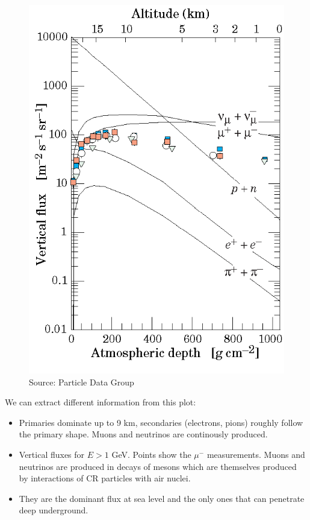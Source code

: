 \documentclass[
  letterpaper,
  DIV=11,
  numbers=noendperiod]{scrreprt}
\begin{document}
\begin{figure}[H]

{\centering \includegraphics{images/cr_fig3_07.png}

}

\caption{Source: Particle Data Group}

\end{figure}%

We can extract different information from this plot:

\begin{itemize}
\item
  Primaries dominate up to 9 km, secondaries (electrons, pions) roughly
  follow the primary shape. Muons and neutrinos are continously
  produced.
\item
  Vertical fluxes for \(E > 1\) GeV. Points show the \(\mu^-\)
  measurements. Muons and neutrinos are produced in decays of mesons
  which are themselves produced by interactions of CR particles with air
  nuclei.
\item
  They are the dominant flux at sea level and the only ones that can
  penetrate deep underground.
\end{itemize}
\end{document}
